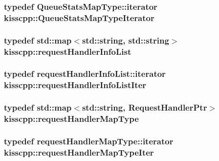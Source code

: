 \hypertarget{a00089_a108455a00c9a8ea1f3416c5cab767bbe}{
\subsubsection[{Queue\-Stats\-Map\-Type\-Iterator}]{\setlength{\rightskip}{0pt plus 5cm}typedef Queue\-Stats\-Map\-Type\-::iterator {\bf kisscpp\-::\-Queue\-Stats\-Map\-Type\-Iterator}}}\label{a00089_a108455a00c9a8ea1f3416c5cab767bbe}
\hypertarget{a00089_a403fe12b3fa48680ec27f8af4286383b}{
\subsubsection[{request\-Handler\-Info\-List}]{\setlength{\rightskip}{0pt plus 5cm}typedef std\-::map$<$std\-::string, std\-::string$>$ {\bf kisscpp\-::request\-Handler\-Info\-List}}}\label{a00089_a403fe12b3fa48680ec27f8af4286383b}
\hypertarget{a00089_a9b5b819d32c8f71acb0a5b292303b8e1}{
\subsubsection[{request\-Handler\-Info\-List\-Iter}]{\setlength{\rightskip}{0pt plus 5cm}typedef request\-Handler\-Info\-List\-::iterator {\bf kisscpp\-::request\-Handler\-Info\-List\-Iter}}}\label{a00089_a9b5b819d32c8f71acb0a5b292303b8e1}
\hypertarget{a00089_acaaba8d5ee3dd772dbf008749245c357}{
\subsubsection[{request\-Handler\-Map\-Type}]{\setlength{\rightskip}{0pt plus 5cm}typedef std\-::map$<$std\-::string, {\bf Request\-Handler\-Ptr}$>$ {\bf kisscpp\-::request\-Handler\-Map\-Type}}}\label{a00089_acaaba8d5ee3dd772dbf008749245c357}
\hypertarget{a00089_acb02d872f8089cccfccea0cbf2191a76}{
\subsubsection[{request\-Handler\-Map\-Type\-Iter}]{\setlength{\rightskip}{0pt plus 5cm}typedef request\-Handler\-Map\-Type\-::iterator {\bf kisscpp\-::request\-Handler\-Map\-Type\-Iter}}}\label{a00089_acb02d872f8089cccfccea0cbf2191a76}
